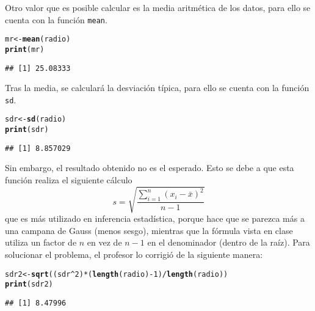 \documentclass[12pt]{report}\usepackage[]{graphicx}\usepackage[dvipsnames]{xcolor}
\makeatletter
\newcommand{\hlnum}[1]{\textcolor[rgb]{0.686,0.059,0.569}{#1}}%
\newcommand{\hlopt}[1]{\textcolor[rgb]{0,0,0}{#1}}%
\newcommand{\hlstd}[1]{\textcolor[rgb]{0.345,0.345,0.345}{#1}}%
\newcommand{\hlkwb}[1]{\textcolor[rgb]{0.69,0.353,0.396}{#1}}%
\newcommand{\hlkwd}[1]{\textcolor[rgb]{0.737,0.353,0.396}{\textbf{#1}}}%
\newenvironment{kframe}{%
 \def\at@end@of@kframe{}%
 \ifinner\ifhmode%
  \def\at@end@of@kframe{\end{minipage}}%
  \begin{minipage}{\columnwidth}%
 \fi\fi%
 \def\FrameCommand##1{\hskip\@totalleftmargin \hskip-\fboxsep
 \colorbox{shadecolor}{##1}\hskip-\fboxsep
     \hskip-\linewidth \hskip-\@totalleftmargin \hskip\columnwidth}%
 \MakeFramed {\advance\hsize-\width
   \@totalleftmargin\z@ \linewidth\hsize
   \@setminipage}}%
 {\par\unskip\endMakeFramed%
 \at@end@of@kframe}
\newenvironment{knitrout}{}{} %
\makeatother
\begin{document}
			Otro valor que es posible calcular es la media aritmética de los datos, para ello se cuenta con la función \texttt{mean}.
			
\begin{knitrout}
\color{fgcolor}\begin{kframe}
\begin{alltt}
\hlstd{mr} \hlkwb{<-} \hlkwd{mean}\hlstd{(radio)}
\hlkwd{print}\hlstd{(mr)}
\end{alltt}
\begin{verbatim}
## [1] 25.08333
\end{verbatim}
\end{kframe}
\end{knitrout}
			
			Tras la media, se calculará la desviación típica, para ello se cuenta con la función \texttt{sd}. 
			
\begin{knitrout}
\color{fgcolor}\begin{kframe}
\begin{alltt}
\hlstd{sdr} \hlkwb{<-} \hlkwd{sd}\hlstd{(radio)}
\hlkwd{print}\hlstd{(sdr)}
\end{alltt}
\begin{verbatim}
## [1] 8.857029
\end{verbatim}
\end{kframe}
\end{knitrout}
			
			Sin embargo, el resultado obtenido no es el esperado. Esto se debe a que esta función realiza el siguiente cálculo
			$$
			s = \sqrt{\frac{\displaystyle\sum_{i=1}^n (x_i-\bar{x})^2}{n-1}}
			$$
			que es más utilizado en inferencia estadística, porque hace que se parezca más a una campana de Gauss (menos sesgo), mientras que la fórmula vista en clase utiliza un factor de $n$ en vez de $n-1$ en el denominador (dentro de la raíz). Para solucionar el problema, el profesor lo corrigió de la siguiente manera: 
			
\begin{knitrout}
\color{fgcolor}\begin{kframe}
\begin{alltt}
\hlstd{sdr2} \hlkwb{<-} \hlkwd{sqrt}\hlstd{((sdr}\hlopt{^}\hlnum{2}\hlstd{)}\hlopt{*}\hlstd{(}\hlkwd{length}\hlstd{(radio)}\hlopt{-}\hlnum{1}\hlstd{)}\hlopt{/}\hlkwd{length}\hlstd{(radio))}
\hlkwd{print}\hlstd{(sdr2)}
\end{alltt}
\begin{verbatim}
## [1] 8.47996
\end{verbatim}
\end{kframe}
\end{knitrout}
			
\end{document}

